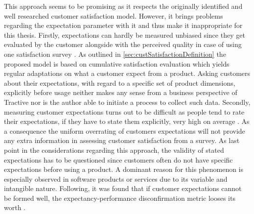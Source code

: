 This approach seems to be promising as it respects the originally identified and well researched customer satisfaction model. However, it brings problems regarding the expectation parameter with it and thus make it inappropriate for this thesis. Firstly, expectations can hardly be measured unbiased since they get evaluated by the customer alongside with the perceived quality in case of using one satisfaction survey \cite{getty1995relationship}. As outlined in \ref{sec:custSatisfactionDefinition} the proposed model is based on cumulative satisfaction evaluation which yields regular adaptations on what a customer expect from a product. Asking customers about their expectations, with regard to a specific set of product dimensions, explicitly before usage neither makes any sense from a business perspective of Tractive nor is the author able to initiate a process to collect such data. Secondly, measuring customer expectations turns out to be difficult as people tend to rate their expectations, if they have to state them explicitly, very high on average \cite{babakus1992empirical}. As a consequence the uniform overrating of customers expectations will not provide any extra information in assessing customer satisfaction from a survey. As last point in the considerations regarding this approach, the validity of stated expectations has to be questioned since customers often do not have specific expectations before using a product. A dominant reason for this phenomenon is especially observed in software products or services due to its variable and intangible nature. Following, it was found that if customer expectations cannot be formed well, the expectancy-performance disconfirmation metric looses its worth \cite{halstead1994multisource}. 

